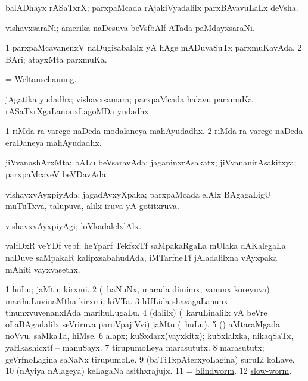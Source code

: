 \begin{center}
\bentry 
{} 
\gl{\nA}
\expl{}
\bmng
balADhayx rASaTxrX; parxpaMcada rAjakiVyadalilx parxBAvavuLaLx deVsha. 
\emng
\eentry

\bentry
{} 
\gl{\nA}
\expl{}
\bmng
vishavxsaraNi; amerika naDesuva beVsfbAlf ATada paMdayxsaraNi. 
\emng
\eentry

\bentry
{} 
\gl{\gu}
\expl{}
\bmng
\bnum
\num{1} parxpaMcavanenxV naDugisabalalx yA hAge mADuvaSuTx parxmuKavAda. 
\num{2} BAri; atayxMta parxmuKa. 
\enum
\emng
\eentry

\bentry
{} 
\gl{\nA}
\expl{}
\bmng
= \hyperlink{Weltanschauung}{Weltanschauung}. 
\emng
\eentry

\bentry
{} 
\gl{\nA}
\expl{}
\bmng
jAgatika yudadhx; vishavxsamara; parxpaMcada halavu parxmuKa rASaTxrXgaLanonxLagoMDa yudadhx. 
\emng

\noindent
\gl{\pagu}
\expl{}
\bmng
\bnum
\num{1}   riMda ra varege naDeda modalaneya mahAyudadhx. 
\num{2}   riMda ra varege naDeda eraDaneya mahAyudadhx. 
\enum
\emng
\eentry

\bentry 
{} 
\gl{\gu}
\expl{}
\bmng
jiVvanashArxMta; bALu beVsaravAda; jaganinxrAsakatx; jiVvananirAsakitxya; parxpaMcaveV beVDavAda. 
\emng
\eentry

\bentry
{} 
\gl{\gu}
\expl{}
\bmng
vishavxvAyxpiyAda; jagadAvxyXpaka; parxpaMcada elAlx BAgagaLigU muTuTxva, talupuva, alilx iruva yA gotitxruva. 
\emng
\eentry

\bentry
{} 
\gl{\kirxvi}
\expl{}
\bmng
vishavxvAyxpiyAgi; loVkadalelxlAlx. 
\emng
\eentry

\bentry
{} 
\gl{\nA}
\expl{}
\bmng
valfDxR veYDf vebf; heYparf TekfsxTf saMpakaRgaLa mUlaka dAKalegaLa naDuve saMpakaR kalipxsabahudAda, iMTarfneTf jAladalilxna vAyxpaka mAhiti vayxvasethx. 
\emng
\eentry

\bentry
{} 
\gl{\nA}
\expl{}
\bmng
\bnum
\num{1} huLu; jaMtu; kirxmi. 
\num{2} (\kanmu\ haNuNx, marada dimimx, \mo vanunx koreyuva) marihuLuvinaMtha kirxmi, kiVTa. 
\num{3} hULida shavagaLanunx tinunxvuvenanxlAda marihuLugaLu. 
\num{4} (\bava dalilx) (\kanmu\ karuLinalilx yA beVre oLaBAgadalilx seVriruva paroVpajiVvi) jaMtu (\mo\ huLu). 
\num{5} (\rUpa) aMtaraMgada noVvu, saMkaTa, hiMse. 
\num{6} alapx; kuSxdarx(vayxkitx); kuSxlalxka, nikaqSaTx, yaHkashicxtf -- manuSayx. 
\num{7} tirupumoLeya marasututx. 
\num{8} marasututx; geVrfnoLagina saNaNx tirupumoLe. 
\num{9} (baTiTxpAterxyoLagina) suruLi koLave. 
\num{10} (nAyiya nAlageya) keLagaNa asithxrajujx. 
\num{11} = \hyperref{kandict_b.pdf}{B}{blindworm}{blindworm}. 
\num{12} \hyperref{kandict_s.pdf}{S}{slow-worm}{slow-worm}. 
\enum
\emng


\end{center}

